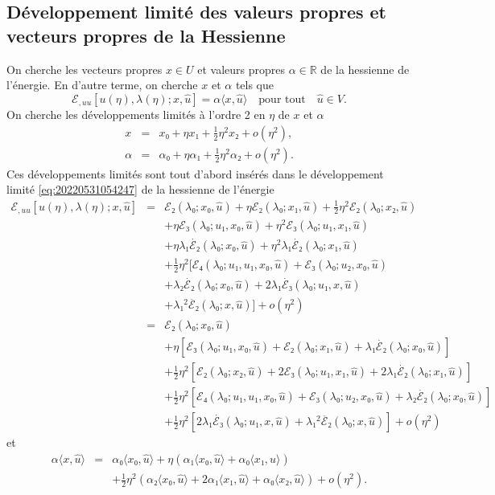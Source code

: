 \documentclass[12pt, final]{amsart}
\theoremstyle{definition}
\newcommand{\reals}{\mathbb{R}}
\begin{document}
\subsection{Développement limité des valeurs propres et vecteurs
propres de la Hessienne}

On cherche les vecteurs propres \(x∈U\) et valeurs propres \(α \in \reals\) de la hessienne de l'énergie. En d'autre terme, on cherche \(x\) et \(α\) tels que
\begin{equation}
 ℰ_{, u u} [u(η), λ(η); x, \hat{u}] =
 α 〈 x, \hat{u} 〉 \quad \text{pour tout} \quad \hat{u} \in
 V.
\end{equation}
On cherche les développements limités à l'ordre 2 en \(η\) de \(x\) et \(α\)
\begin{eqnarray*}
 x & = & x₀ + η x₁ + \tfrac{1}{2} η^2 x₂ + o(η^2),\\
 α & = & α₀ + η α₁ + \tfrac{1}{2} η^2 α₂ + o
 (η^2) .
\end{eqnarray*}
Ces développements limités sont tout d'abord insérés dans le développement limité \eqref{eq:20220531054247} de la hessienne de l'énergie
\begin{eqnarray*}
 ℰ_{, u u} [u(η), λ(η); x, \hat{u}] & = &
 ℰ₂(λ₀; x₀, \hat{u}) + η ℰ₂(λ₀ ;
 x₁, \hat{u}) + \tfrac{1}{2} η^2 ℰ₂(λ₀; x₂,
 \hat{u})\\
 & & + η ℰ₃(λ₀; u₁, x₀, \hat{u}) + η^2
 ℰ₃(λ₀; u₁, x₁, \hat{u})\\
 & & + η λ₁ \dot{ℰ₂}(λ₀; x₀, \hat{u}) +
 η^2 λ₁ \dot{ℰ₂}(λ₀; x₁, \hat{u})\\
 & & + \tfrac{1}{2} η^2 [ℰ₄(λ₀; u₁, u₁, x₀,
 \hat{u}) +ℰ₃(λ₀; u₂, x₀, \hat{u})\\
 & & + λ₂ \dot{ℰ₂}(λ₀; x₀, \hat{u}) + 2
 λ₁ \dot{ℰ₃}(λ₀; u₁, x, \hat{u})\\
 & & + λ₁^2 \ddot{ℰ₂}(λ₀; x, \hat{u})
 ] + o(η^2)\\
 & = & ℰ₂(λ₀; x₀, \hat{u})\\
 & & + η [ℰ₃(λ₀; u₁, x₀, \hat{u}) +ℰ₂
 (λ₀; x₁, \hat{u}) + λ₁ \dot{ℰ₂}(λ₀ ;
 x₀, \hat{u})]\\
 & & + \tfrac{1}{2} η^2 [ℰ₂(λ₀; x₂, \hat{u}) +
 2ℰ₃(λ₀; u₁, x₁, \hat{u}) + 2 λ₁
 \dot{ℰ₂}(λ₀; x₁, \hat{u})]\\
 & & + \tfrac{1}{2} η^2 [ℰ₄(λ₀; u₁, u₁, x₀,
 \hat{u}) +ℰ₃(λ₀; u₂, x₀, \hat{u}) + λ₂
 \dot{ℰ₂}(λ₀; x₀, \hat{u})]\\
 & & + \tfrac{1}{2} η^2 [2 λ₁ \dot{ℰ₃}(λ₀ ;
 u₁, x, \hat{u}) + λ₁^2 \ddot{ℰ₂}(λ₀; x,
 \hat{u})] + o(η^2)
\end{eqnarray*}
et
\begin{eqnarray*}
 α 〈 x, \hat{u} 〉 & = & α₀ 〈 x₀, \hat{u}
 〉 + η(α₁ 〈 x₀, \hat{u} 〉 + α₀ 〈
 x₁, \hat{u} 〉)\\
 & & + \tfrac{1}{2} η^2 (α₂ 〈 x₀, \hat{u} 〉 + 2
 α₁ 〈 x₁, \hat{u} 〉 + α₀ 〈 x₂, \hat{u}
 〉) + o(η^2) .
\end{eqnarray*}
\end{document}
